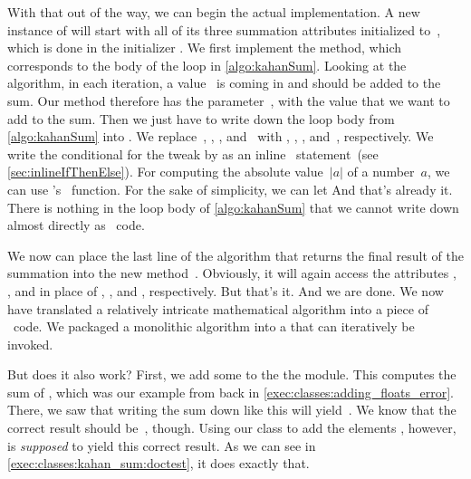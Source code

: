 With that out of the way, we can begin the actual implementation.
A new instance of  will start with all of its three summation attributes initialized to~, which is done in the initializer .
We first implement the  method, which corresponds to the body of the loop in \cref{algo:kahanSum}.
Looking at the algorithm, in each iteration, a value~ is coming in and should be added to the sum.
Our  method therefore has the parameter~, with the value that we want to add to the sum.
Then we just have to write down the loop body from \cref{algo:kahanSum} into .
We replace~, , , and~ with , , , and~, respectively.
We write the conditional for the tweak by \citeauthor{N1974REVZSES} as an inline ~statement~(see \cref{sec:inlineIfThenElse}).
For computing the absolute value~$|a|$ of a number~$a$, we can use \python's ~function.
For the sake of simplicity, we can let
And that's already it.
There is nothing in the loop body of \cref{algo:kahanSum} that we cannot write down almost directly as \python\ code.

We now can place the last line of the algorithm that returns the final result of the summation into the new method~.
Obviously, it will again access the attributes , , and  in place of , , and , respectively.
But that's it.
And we are done.
We now have translated a relatively intricate mathematical algorithm into a piece of \python\ code.
We packaged a monolithic algorithm into a  that can iteratively be invoked.

But does it also work?
First, we add some  to the  the module.
This  computes the sum of , which was our example from back in \cref{exec:classes:adding_floats_error}.
There, we saw that writing the sum down like this will yield~.
We know that the correct result should be~, though.
Using our  class to add the elements \pythonil{[1e18, 1, 1e36, -1e36, -1e18]}, however, is \emph{supposed} to yield this correct result.
As we can see in \cref{exec:classes:kahan_sum:doctest}, it does exactly that.

